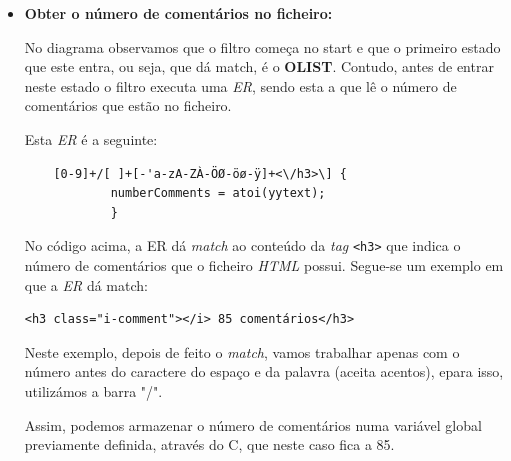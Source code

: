 \documentclass[a4paper,12pt]{report}
\newcommand*{\xml}[1]{\texttt{<#1>}}
\begin{document}
\begin{itemize}
    \item 
    \textbf{Obter o número de comentários no ficheiro:}
    
    \par No diagrama observamos que o filtro começa no start e que o primeiro estado que este entra, ou seja, que dá match, é o \textbf{OLIST}. Contudo, antes de entrar neste estado o filtro executa uma \textit{ER}, sendo esta a que lê o número de comentários que estão no ficheiro.
\par Esta \textit{ER} é a seguinte:

\begin{verbatim}
    [0-9]+/[ ]+[-'a-zA-ZÀ-ÖØ-öø-ÿ]+<\/h3>\] { 
            numberComments = atoi(yytext);
            }
\end{verbatim}

\par No código acima, a ER dá \textit{match} ao conteúdo da \textit{tag} \xml{h3} que indica o número de comentários que o ficheiro \textit{HTML} possui. Segue-se um exemplo em que a \textit{ER} dá match:

\begin{verbatim}
<h3 class="i-comment"></i> 85 comentários</h3>
\end{verbatim}


Neste exemplo, depois de feito o \textit{match}, vamos trabalhar apenas com o número antes do caractere do espaço e da palavra (aceita acentos), epara isso, utilizámos a barra "/".
\par Assim, podemos armazenar o número de comentários numa variável global previamente definida, através do C, que neste caso fica a 85.

\end{itemize}

\vspace{1cm}
\end{document}
